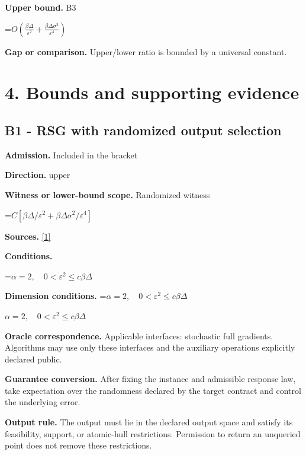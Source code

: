\documentclass[10pt,a4paper]{article}
\newcommand{\AtlasMath}[1]{\par\begingroup\centering\setbox0=\hbox{$\displaystyle #1$}\ifdim\wd0>1.4\linewidth\typeout{ATLAS WIDE FORMULA: \the\wd0}\fi\ifdim\wd0>\linewidth\resizebox{\linewidth}{!}{\box0}\else\box0\fi\par\endgroup}
\newcommand{\AtlasInlineMath}[1]{\begingroup\setbox0=\hbox{$#1$}\ifdim\wd0>.4\linewidth\endgroup\AtlasMath{#1}\else\endgroup$#1$\fi}
\begin{document}
\textbf{Upper bound.} B3



\AtlasMath{O\!\left(\frac{\beta\Delta}{\varepsilon^2}+\frac{\beta\Delta\sigma^2}{\varepsilon^4}\right)}


\textbf{Gap or comparison.} Upper/lower ratio is bounded by a universal constant.



\section{4. Bounds and supporting evidence}


\subsection{B1 - RSG with randomized output selection}


\textbf{Admission.} Included in the bracket



\textbf{Direction.} upper



\textbf{Witness or lower-bound scope.} Randomized witness



\AtlasMath{C[\beta\Delta/\varepsilon^2+\beta\Delta\sigma^2/\varepsilon^4]}


\textbf{Sources.} \href{https://arxiv.org/pdf/1309.5549}{[1]}



\textbf{Conditions.}
\AtlasMath{\alpha=2,\quad0<\varepsilon^2\le c\beta\Delta}




\textbf{Dimension conditions.} \AtlasInlineMath{\alpha=2,\quad0<\varepsilon^2\le c\beta\Delta}



\textbf{Oracle correspondence.} Applicable interfaces: stochastic full gradients. Algorithms may use only these interfaces and the auxiliary operations explicitly declared public.



\textbf{Guarantee conversion.} After fixing the instance and admissible response law, take expectation over the randomness declared by the target contract and control the underlying error.



\textbf{Output rule.} The output must lie in the declared output space and satisfy its feasibility, support, or atomic-hull restrictions. Permission to return an unqueried point does not remove these restrictions.
\end{document}
